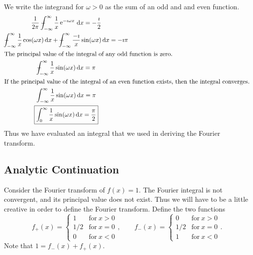 \begin{Example}
  We write the integrand for $\omega > 0$ as the sum of an odd and 
  and even function.
  \begin{gather*}
    \frac{1}{2\pi} \pv \int_{-\infty}^\infty \frac{1}{x} \e^{-\imath \omega x}\,\dd x = - \frac{\imath}{2} 
    \\
    \pv \int_{-\infty}^\infty \frac{1}{x} \cos(\omega x)\,\dd x +
    \pv \int_{-\infty}^\infty \frac{- \imath}{x} \sin(\omega x)\,\dd x = -\imath \pi
    \\
    \intertext{The principal value of the integral of any odd function is zero.}
    \pv \int_{-\infty}^\infty \frac{1}{x} \sin(\omega x)\,\dd x = \pi 
    \\
    \intertext{If the principal value of the integral of an even function exists,
      then the integral converges.}
    \int_{-\infty}^\infty \frac{1}{x} \sin(\omega x)\,\dd x = \pi 
    \\
    \boxed{ 
      \int_0^\infty \frac{1}{x} \sin(\omega x)\,\dd x = \frac{\pi}{2}
      }
  \end{gather*}
  Thus we have evaluated an integral that we used in deriving the Fourier
  transform.
\end{Example}














\subsection{Analytic Continuation}









Consider the Fourier transform of $f(x) = 1$.  The Fourier integral is
not convergent, and its principal value does not exist.  Thus we will
have to be a little creative in order to define the Fourier transform.
Define the two functions
\[ 
f_+(x) = \begin{cases} 
  1 &\mathrm{for}\ x > 0 
  \\ 
  1/2 &\mathrm{for}\ x = 0 
  \\ 
  0 &\mathrm{for}\ x < 0 
\end{cases}, \qquad
f_-(x) = \begin{cases} 
  0 &\mathrm{for}\ x > 0 
  \\ 
  1/2 &\mathrm{for}\ x = 0 
  \\ 
  1 &\mathrm{for}\ x < 0 
\end{cases}. 
\]
Note that $1 = f_-(x) + f_+(x)$.

